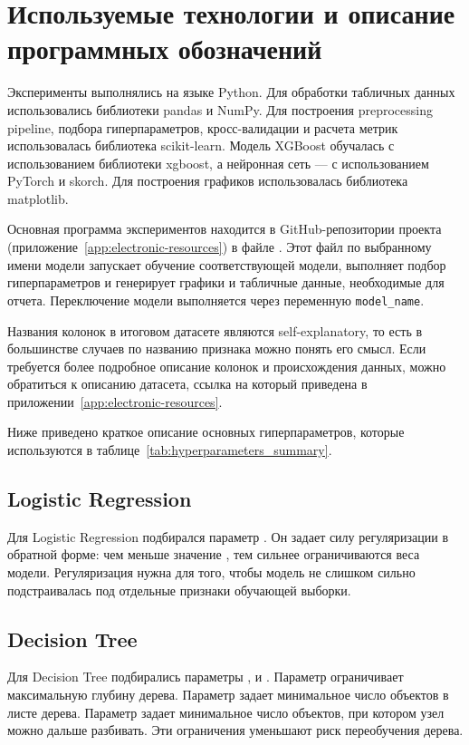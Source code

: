 \documentclass[14pt,a4paper]{extreport}
\begin{document}
\section{Используемые технологии и описание программных обозначений}

Эксперименты выполнялись на языке Python. Для обработки табличных данных использовались библиотеки pandas и NumPy. Для построения preprocessing pipeline, подбора гиперпараметров, кросс-валидации и расчета метрик использовалась библиотека scikit-learn. Модель XGBoost обучалась с использованием библиотеки xgboost, а нейронная сеть --- с использованием PyTorch и skorch. Для построения графиков использовалась библиотека matplotlib.

Основная программа экспериментов находится в GitHub-репозитории проекта (приложение~\ref{app:electronic-resources}) в файле . Этот файл по выбранному имени модели запускает обучение соответствующей модели, выполняет подбор гиперпараметров и генерирует графики и табличные данные, необходимые для отчета. Переключение модели выполняется через переменную \texttt{model\_name}.

Названия колонок в итоговом датасете являются self-explanatory, то есть в большинстве случаев по названию признака можно понять его смысл. Если требуется более подробное описание колонок и происхождения данных, можно обратиться к описанию датасета, ссылка на который приведена в приложении~\ref{app:electronic-resources}.

Ниже приведено краткое описание основных гиперпараметров, которые используются в таблице~\ref{tab:hyperparameters_summary}.

\subsection{Logistic Regression}

Для Logistic Regression подбирался параметр . Он задает силу регуляризации в обратной форме: чем меньше значение , тем сильнее ограничиваются веса модели. Регуляризация нужна для того, чтобы модель не слишком сильно подстраивалась под отдельные признаки обучающей выборки.

\subsection{Decision Tree}

Для Decision Tree подбирались параметры ,  и . Параметр  ограничивает максимальную глубину дерева. Параметр  задает минимальное число объектов в листе дерева. Параметр  задает минимальное число объектов, при котором узел можно дальше разбивать. Эти ограничения уменьшают риск переобучения дерева.
\end{document}
